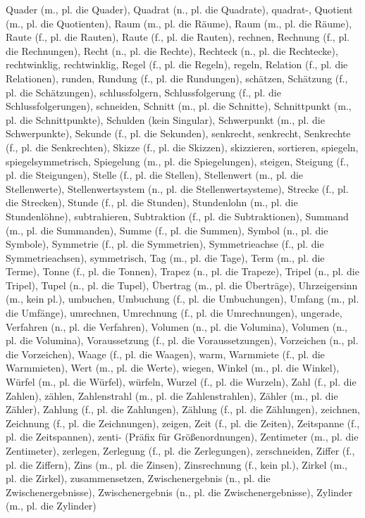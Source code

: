 Quader (m., pl. die Quader),
Quadrat (n., pl. die Quadrate),
quadrat-,
Quotient (m., pl. die Quotienten),
Raum (m., pl. die Räume),
Raum (m., pl. die Räume),
Raute (f., pl. die Rauten),
Raute (f., pl. die Rauten),
rechnen,
Rechnung (f., pl. die Rechnungen),
Recht (n., pl. die Rechte),
Rechteck (n., pl. die Rechtecke),
rechtwinklig,
rechtwinklig,
Regel (f., pl. die Regeln),
regeln,
Relation (f., pl. die Relationen),
runden,
Rundung (f., pl. die Rundungen),
schätzen,
Schätzung (f., pl. die Schätzungen),
schlussfolgern,
Schlussfolgerung (f., pl. die Schlussfolgerungen),
schneiden,
Schnitt (m., pl. die Schnitte),
Schnittpunkt (m., pl. die Schnittpunkte),
Schulden (kein Singular),
Schwerpunkt (m., pl. die Schwerpunkte),
Sekunde (f., pl. die Sekunden),
senkrecht,
senkrecht,
Senkrechte (f., pl. die Senkrechten),
Skizze (f., pl. die Skizzen),
skizzieren,
sortieren,
spiegeln,
spiegelsymmetrisch,
Spiegelung (m., pl. die Spiegelungen),
steigen,
Steigung (f., pl. die Steigungen),
Stelle (f., pl. die Stellen),
Stellenwert (m., pl. die Stellenwerte),
Stellenwertsystem (n., pl. die Stellenwertsysteme),
Strecke (f., pl. die Strecken),
Stunde (f., pl. die Stunden),
Stundenlohn (m., pl. die Stundenlöhne),
subtrahieren,
Subtraktion (f., pl. die Subtraktionen),
Summand (m., pl. die Summanden),
Summe (f., pl. die Summen),
Symbol (n., pl. die Symbole),
Symmetrie (f., pl. die Symmetrien),
Symmetrieachse (f., pl. die Symmetrieachsen),
symmetrisch,
Tag (m., pl. die Tage),
Term (m., pl. die Terme),
Tonne (f., pl. die Tonnen),
Trapez (n., pl. die Trapeze),
Tripel (n., pl. die Tripel),
Tupel (n., pl. die Tupel),
Übertrag (m., pl. die Überträge),
Uhrzeigersinn (m., kein pl.),
umbuchen,
Umbuchung (f., pl. die Umbuchungen),
Umfang (m., pl. die Umfänge),
umrechnen,
Umrechnung (f., pl. die Umrechnungen),
ungerade,
Verfahren (n., pl. die Verfahren),
Volumen (n., pl. die Volumina),
Volumen (n., pl. die Volumina),
Voraussetzung (f., pl. die Voraussetzungen),
Vorzeichen (n., pl. die Vorzeichen),
Waage (f., pl. die Waagen),
warm,
Warmmiete (f., pl. die Warmmieten),
Wert (m., pl. die Werte),
wiegen,
Winkel (m., pl. die Winkel),
Würfel (m., pl. die Würfel),
würfeln,
Wurzel (f., pl. die Wurzeln),
Zahl (f., pl. die Zahlen),
zählen,
Zahlenstrahl (m., pl. die Zahlenstrahlen),
Zähler (m., pl. die Zähler),
Zahlung (f., pl. die Zahlungen),
Zählung (f., pl. die Zählungen),
zeichnen,
Zeichnung (f., pl. die Zeichnungen),
zeigen,
Zeit (f., pl. die Zeiten),
Zeitspanne (f., pl. die Zeitspannen),
zenti- (Präfix für Größenordnungen),
Zentimeter (m., pl. die Zentimeter),
zerlegen,
Zerlegung (f., pl. die Zerlegungen),
zerschneiden,
Ziffer (f., pl. die Ziffern),
Zins (m., pl. die Zinsen),
Zinsrechnung (f., kein pl.),
Zirkel (m., pl. die Zirkel),
zusammensetzen,
Zwischenergebnis (n., pl. die Zwischenergebnisse),
Zwischenergebnis (n., pl. die Zwischenergebnisse),
Zylinder (m., pl. die Zylinder) 